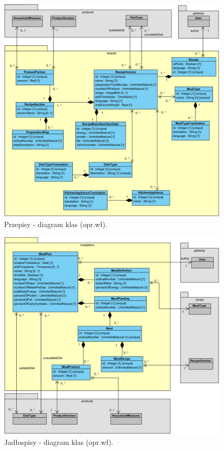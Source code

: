 \begin{minipage}{\textwidth}
    \begin{figure}[H]
        \centering\includegraphics[scale=0.7]{../uml/class_diagrams/recipes.png}
        \caption{Przepisy - diagram klas (opr.wł).}\label{rysunek:class-diagram-recipes}
    \end{figure}
\end{minipage}

\begin{minipage}{\textwidth}
    \begin{figure}[H]
        \centering\includegraphics[scale=0.7]{../uml/class_diagrams/mealplans.png}
        \caption{Jadłospisy - diagram klas (opr.wł).}\label{rysunek:class-diagram-mealplans}
    \end{figure}
\end{minipage}


